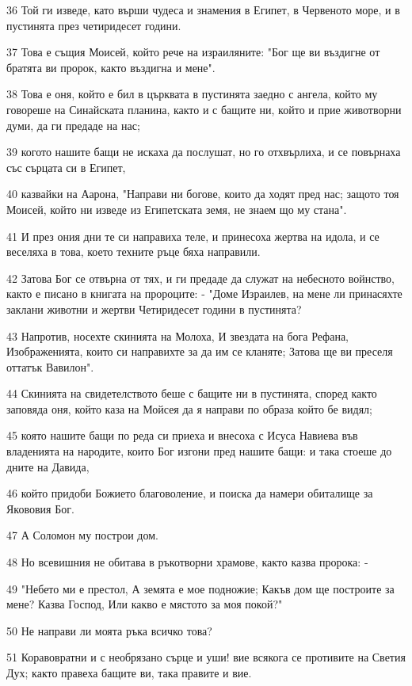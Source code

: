\par 36 Той ги изведе, като върши чудеса и знамения в Египет, в Червеното море, и в пустинята през четиридесет години.
\par 37 Това е същия Моисей, който рече на израиляните: "Бог ще ви въздигне от братята ви пророк, както въздигна и мене".
\par 38 Това е оня, който е бил в църквата в пустинята заедно с ангела, който му говореше на Синайската планина, както и с бащите ни, който и прие животворни думи, да ги предаде на нас;
\par 39 когото нашите бащи не искаха да послушат, но го отхвърлиха, и се повърнаха със сърцата си в Египет,
\par 40 казвайки на Аарона, "Направи ни богове, които да ходят пред нас; защото тоя Моисей, който ни изведе из Египетската земя, не знаем що му стана".
\par 41 И през ония дни те си направиха теле, и принесоха жертва на идола, и се веселяха в това, което техните ръце бяха направили.
\par 42 Затова Бог се отвърна от тях, и ги предаде да служат на небесното войнство, както е писано в книгата на пророците: - "Доме Израилев, на мене ли принасяхте заклани животни и жертви Четиридесет години в пустинята?
\par 43 Напротив, носехте скинията на Молоха, И звездата на бога Рефана, Изображенията, които си направихте за да им се кланяте; Затова ще ви преселя оттатък Вавилон".
\par 44 Скинията на свидетелството беше с бащите ни в пустинята, според както заповяда оня, който каза на Мойсея да я направи по образа който бе видял;
\par 45 която нашите бащи по реда си приеха и внесоха с Исуса Навиева във владенията на народите, които Бог изгони пред нашите бащи: и така стоеше до дните на Давида,
\par 46 който придоби Божието благоволение, и поиска да намери обиталище за Якововия Бог.
\par 47 А Соломон му построи дом.
\par 48 Но всевишния не обитава в ръкотворни храмове, както казва пророка: -
\par 49 "Небето ми е престол, А земята е мое подножие; Какъв дом ще построите за мене? Казва Господ, Или какво е мястото за моя покой?"
\par 50 Не направи ли моята ръка всичко това?
\par 51 Коравовратни и с необрязано сърце и уши! вие всякога се противите на Светия Дух; както правеха бащите ви, така правите и вие.
